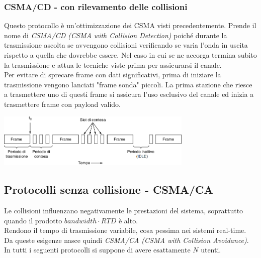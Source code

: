 \documentclass[10pt,a4paper,twoside]{article}
\begin{document}
\subsubsection{CSMA/CD - con rilevamento delle collisioni}
Questo protocollo è un'ottimizzazione dei CSMA visti precedentemente. Prende il nome di \textit{CSMA/CD (CSMA with Collision Detection)} poiché durante la trasmissione ascolta se avvengono collisioni verificando se varia l'onda in uscita rispetto a quella che dovrebbe essere. Nel caso in cui se ne accorga termina subito la trasmissione e attua le tecniche viste prima per assicurarsi il canale.\\
Per evitare di sprecare frame con dati significativi, prima di iniziare la trasmissione vengono lanciati "frame sonda" piccoli. La prima stazione che riesce a trasmettere uno di questi frame si assicura l'uso esclusivo del canale ed inizia a trasmettere frame con payload valido.
\begin{center}
\includegraphics[width=0.7\textwidth]{images/csmacd.png}
\end{center}

\subsection{Protocolli senza collisione - CSMA/CA}
Le collisioni influenzano negativamente le prestazioni del sistema, soprattutto quando il prodotto $bandwidth\cdot RTD$ è alto.\\
Rendono il tempo di trasmissione variabile, cosa pessima nei sistemi real-time.\\
Da queste esigenze nasce quindi \textit{CSMA/CA (CSMA with Collision Avoidance)}.
In tutti i seguenti protocolli si suppone di avere esattamente $N$ utenti.
\end{document}
